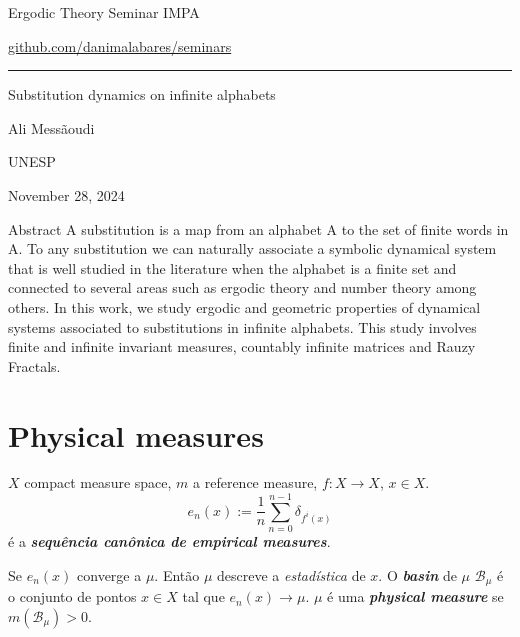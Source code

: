 


\begin{minipage}{\textwidth}
	\begin{minipage}{1\textwidth}
		Ergodic Theory Seminar \hfill IMPA
		
		{\small\hfill\href{https://github.com/danimalabares/seminars}{github.com/danimalabares/seminars}}

		
	\end{minipage}
\end{minipage}\vspace{.2cm}\hrule

\vspace{10pt}

{\Huge Substitution dynamics on infinite alphabets}

\hfill{\Large Ali Messãoudi}

{\Large \hfill UNESP}

\hfill{\large November 28, 2024}

\begin{thing4}{Abstract}\leavevmode
A substitution is a map from an alphabet A to the set
of finite words in A. To any substitution we can naturally associate
a symbolic dynamical system that is well studied in the literature
when the alphabet is a finite set and connected to several areas such
as ergodic theory and number theory among others. In this work,
we study ergodic and geometric properties of dynamical systems
associated to substitutions in infinite alphabets. This study involves
finite and infinite invariant measures, countably infinite matrices
and Rauzy Fractals.	
\end{thing4}

\tableofcontents

\section{Physical measures}

$X$ compact measure space, $m$ a reference measure, $f:X \to X$, $x \in X$.
\[e_n(x):=\frac{1}{n}\sum_{n=0}^{n-1}\delta_{f^i(x)}\]
é a \textit{\textbf{sequência canônica de empirical measures}}.

Se $e_n(x)$ converge a $\mu$. Então $\mu$ descreve a \textit{estadística}  de $x$. O \textit{\textbf{basin}} de $\mu$ $\mathcal{B}_\mu$ é o conjunto de pontos $x \in X$ tal que $e_n(x)\to \mu$. $\mu$ é uma \textit{\textbf{physical measure}} se $m(\mathcal{B}_{\mu})>0$.

